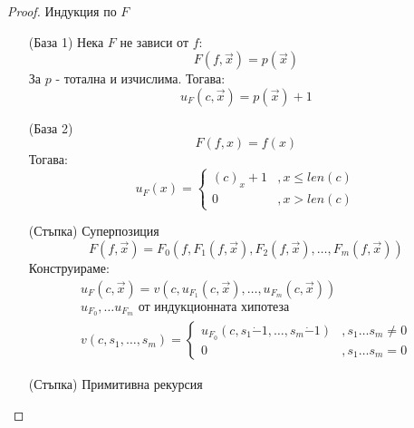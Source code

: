 \begin{proof}
    Индукция по $F$
    \begin{itemize}
        \item[(База 1)] Нека $F$ не зависи от $f$:
        \begin{equation}
            F(f, \overrightarrow{x}) = p(\overrightarrow{x})
        \end{equation}
        За $p$ - тотална и изчислима. Тогава:
        \begin{equation}
            u_F(c, \overrightarrow{x}) = p(\overrightarrow{x}) + 1
        \end{equation}
        \item[(База 2)] 
        \begin{equation}
            F(f, x) = f(x)
        \end{equation}
        Тогава:
        \begin{equation}
            u_F(x) = \begin{cases}
                (c)_x + 1 &, x \leq len(c) \\
                0 &, x > len(c)
            \end{cases}
        \end{equation}
        \item[(Стъпка)] Суперпозиция
        \begin{equation}
            F(f, \overrightarrow{x}) = F_0(f, F_1(f, \overrightarrow{x}), F_2(f, \overrightarrow{x}), \dots, F_m(f, \overrightarrow{x}))
        \end{equation}
        Конструираме:
        \begin{equation}
            \begin{split}
                u_F(c, \overrightarrow{x}) = v(c, u_{F_1}(c, \overrightarrow{x}), \dots, u_{F_m}(c, \overrightarrow{x})) \\
                u_{F_0}, \dots u_{F_m} \text{ от индукционната хипотеза} \\
                v(c, s_1, \dots, s_m) = \begin{cases}
                    u_{F_0}(c, s_1 \dot - 1, \dots, s_m \dot - 1) &, s_1\dots s_m \neq 0 \\
                    0 &, s_1 \dots s_m = 0
                \end{cases}
            \end{split}
        \end{equation}
        \item[(Стъпка)] Примитивна рекурсия
        \begin{equation}

\end{equation}
\end{itemize}
\end{proof}
